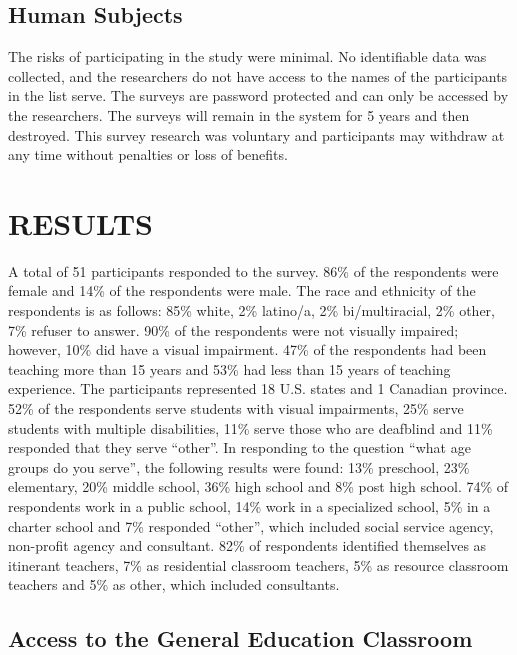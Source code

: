 \documentclass[11.5pt]{sig-alternate} %
\begin{document}
\begin{large}
\subsection*{Human Subjects}

The risks of participating in the study were minimal.  No identifiable data was collected, and the researchers do not have access to the names of the participants in the list serve.  The surveys are password protected and can only be accessed by the researchers. The surveys will remain in the system for 5 years and then destroyed.  This survey research was voluntary and participants may withdraw at any time without penalties or loss of benefits.  

\section*{RESULTS}

A total of 51 participants responded to the survey.  86\% of the respondents were female and 14\% of the respondents were male.  The race and ethnicity of the respondents is as follows:  85\% white, 2\% latino/a, 2\% bi/multiracial, 2\% other, 7\% refuser to answer.  90\% of the respondents were not visually impaired; however, 10\% did have a visual impairment.  47\% of the respondents had been teaching more than 15 years and 53\% had less than 15 years of teaching experience.  The participants represented 18 U.S. states and 1 Canadian province. 52\% of the respondents serve students with visual impairments, 25\% serve students with multiple disabilities, 11\% serve those who are deafblind and 11\% responded that they serve “other”.  In responding to the question “what age groups do you serve”, the following results were found:  13\% preschool, 23\% elementary, 20\% middle school, 36\% high school and 8\% post high school.  74\% of respondents work in a public school, 14\% work in a specialized school, 5\% in a charter school and 7\% responded “other”, which included social service agency, non-profit agency and consultant.  82\% of respondents identified themselves as itinerant teachers, 7\% as residential classroom teachers, 5\% as resource classroom teachers and 5\% as other, which included consultants.  

\subsection*{Access to the General Education Classroom}


\end{large}
\end{document}
